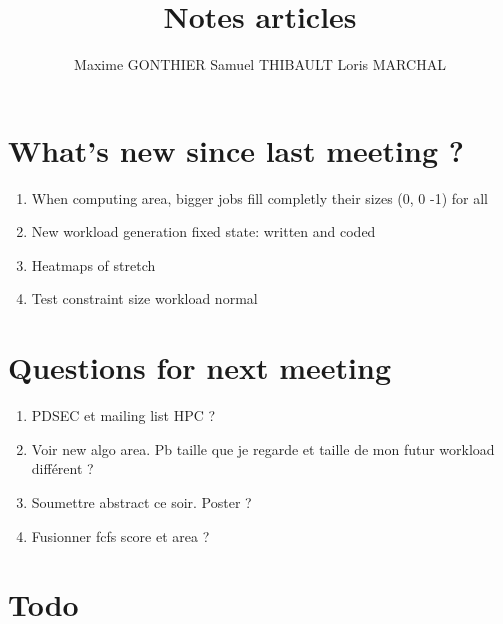 \documentclass[a4paper]{article}
\title{Notes articles}
\author{Maxime GONTHIER Samuel THIBAULT Loris MARCHAL}
\begin{document}
\newpage


\section{What's new since last meeting ?}

	\begin{enumerate}
		\item When computing area, bigger jobs fill completly their sizes (0, 0 -1) for all
		\item New workload generation fixed state: written and coded
		\item Heatmaps of stretch
		\item Test constraint size workload normal
	\end{enumerate}
	
\section{Questions for next meeting}

	\begin{enumerate}
		\item PDSEC et mailing list HPC ?
		\item Voir new algo area. Pb taille que je regarde et taille de mon futur workload différent ?
		\item Soumettre abstract ce soir. Poster ?
		\item Fusionner fcfs score et area ?
	\end{enumerate}

\section{Todo}
\end{document}
